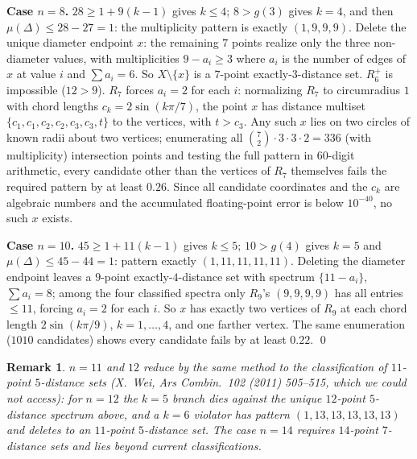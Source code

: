 \documentclass[11pt]{amsart}
\newtheorem{remark}[theorem]{Remark}
\newcommand{\md}{\mu}
\begin{document}
\smallskip\noindent\textbf{Case $n=8$.} $28\ge1+9(k-1)$ gives $k\le4$; $8>g(3)$ gives
$k=4$, and then $\md(\Delta)\le 28-27=1$: the multiplicity pattern is exactly
$(1,9,9,9)$. Delete the unique diameter endpoint $x$: the remaining $7$ points realize
only the three non-diameter values, with multiplicities $9-a_i\ge3$ where $a_i$ is the
number of edges of $x$ at value $i$ and $\sum a_i=6$. So $X\setminus\{x\}$ is a
$7$-point exactly-$3$-distance set. $R_6^+$ is impossible ($12>9$). $R_7$ forces
$a_i=2$ for each $i$: normalizing $R_7$ to circumradius $1$ with chord lengths
$c_k=2\sin(k\pi/7)$, the point $x$ has distance multiset
$\{c_1,c_1,c_2,c_2,c_3,c_3,t\}$ to the vertices, with $t>c_3$. Any such $x$ lies on
two circles of known radii about two vertices; enumerating all
$\binom72\cdot 3\cdot3\cdot2=336$ (with multiplicity) intersection points and testing
the full pattern in $60$-digit arithmetic, every candidate other than the vertices of
$R_7$ themselves fails the required pattern by at least $0.26$. Since all candidate
coordinates and the $c_k$ are algebraic numbers and the accumulated floating-point
error is below $10^{-40}$, no such $x$ exists.

\smallskip\noindent\textbf{Case $n=10$.} $45\ge1+11(k-1)$ gives $k\le5$; $10>g(4)$
gives $k=5$ and $\md(\Delta)\le45-44=1$: pattern exactly $(1,11,11,11,11)$. Deleting
the diameter endpoint leaves a $9$-point exactly-$4$-distance set with spectrum
$\{11-a_i\}$, $\sum a_i=8$; among the four classified spectra only $R_9$'s $(9,9,9,9)$
has all entries $\le11$, forcing $a_i=2$ for each $i$. So $x$ has exactly two vertices
of $R_9$ at each chord length $2\sin(k\pi/9)$, $k=1,\dots,4$, and one farther vertex.
The same enumeration ($1010$ candidates) shows every candidate fails by at least
$0.22$. \qed

\begin{remark}
$n=11$ and $12$ reduce by the same method to the classification of $11$-point
$5$-distance sets (X.~Wei, Ars Combin.\ 102 (2011) 505--515, which we could not
access): for $n=12$ the $k=5$ branch dies against the unique $12$-point $5$-distance
spectrum above, and a $k=6$ violator has pattern $(1,13,13,13,13,13)$ and deletes to an
$11$-point $5$-distance set. The case $n=14$ requires $14$-point $7$-distance sets and
lies beyond current classifications.
\end{remark}
\end{document}
